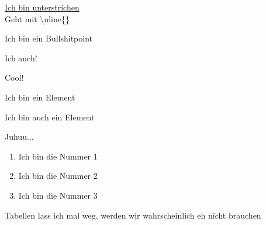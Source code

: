\uline{Ich bin unterstrichen} \\
Geht mit \textbackslash uline\{\}

\begin{list}{•}{}
\item Ich bin ein Bullshitpoint
\item Ich auch!
\item Cool!
\end{list}

\begin{list}{-}{}
\item Ich bin ein Element
\item Ich bin auch ein Element
\item Juhuu...
\end{list}

\begin{enumerate}
\item Ich bin die Nummer 1
\item Ich bin die Nummer 2
\item Ich bin die Nummer 3
\end{enumerate}

Tabellen lass ich mal weg, werden wir wahrscheinlich eh nicht brauchen \cite{goossens93}